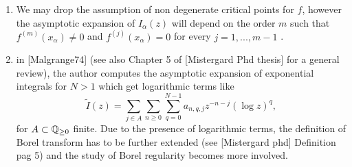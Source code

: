 \documentclass[11pt,a4paper,twoside,leqno,noamsfonts]{amsart}
\numberwithin{equation}{section}
\begin{document}
\begin{remark}
\begin{enumerate}
\item We may drop the assumption of non degenerate critical points for $f$, however the asymptotic expansion of $I_\alpha(z)$ will depend on the order $m$ such that $f^{(m)}(x_\alpha)\neq 0$ and $f^{(j)}(x_\alpha)=0$ for every $j=1,...,m-1$ \cite[Theorem 1 Section 19.2.5]{math-analysis-ii}.
\item in [Malgrange74] (see also Chapter 5 of [Mistergard Phd thesis] for a general review), the author computes the asymptotic expansion of exponential integrals for $N>1$ which get logarithmic terms like 
\[\tilde{I}(z)=\sum_{j\in A} \sum_{n\geq 0}\sum_{q=0}^{N-1}a_{n,q,j}z^{-n-j}(\log z)^q,\] for $A\subset\mathbb Q_{\geq 0}$ finite. Due to the presence of logarithmic terms, the definition of Borel transform has to be further extended  (see [Mistergard phd] Definition pag 5) and the study of Borel regularity becomes more involved.   
\end{enumerate}
\end{remark}
\end{document}
